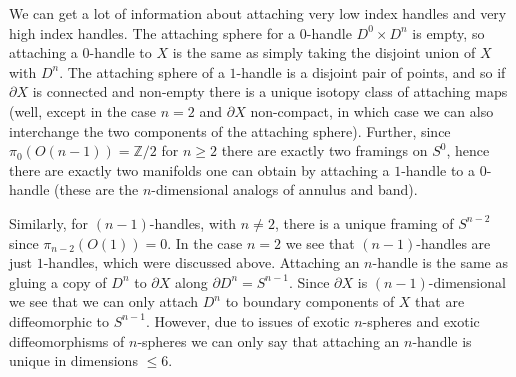 We can get a lot of information about attaching very low index handles and very high index handles. The attaching sphere for a $0$-handle $D^0 \times D^n$ is empty, so attaching a $0$-handle to $X$ is the same as simply taking the disjoint union of $X$ with $D^n$. The attaching sphere of a $1$-handle is a disjoint pair of points, and so if $\partial X$ is connected and non-empty there is a unique isotopy class of attaching maps (well, except in the case $n=2$ and $\partial X$ non-compact, in which case we can also interchange the two components of the attaching sphere). Further, since $\pi_0(O(n-1)) = \mathbb Z/2$ for $n \geq 2$ there are exactly two framings on $S^0$, hence there are exactly two manifolds one can obtain by attaching a $1$-handle to a $0$-handle (these are the $n$-dimensional analogs of annulus and \Mobius band). 

Similarly, for $(n-1)$-handles, with $n \neq 2$, there is a unique framing of $S^{n-2}$ since $\pi_{n-2}(O(1)) = 0$. In the case $n=2$ we see that $(n-1)$-handles are just $1$-handles, which were discussed above. Attaching an $n$-handle is the same as gluing a copy of $D^n$ to $\partial X$ along $\partial D^n = S^{n-1}$. Since $\partial X$ is $(n-1)$-dimensional we see that we can only attach $D^n$ to boundary components of $X$ that are diffeomorphic to $S^{n-1}$. However, due to issues of exotic $n$-spheres and exotic diffeomorphisms of $n$-spheres we can only say that attaching an $n$-handle is unique in dimensions $\leq 6$. 

